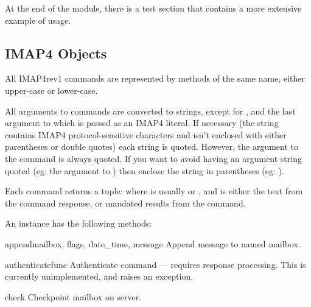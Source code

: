 At the end of the module, there is a test section that contains a more
extensive example of usage.

\begin{seealso}
\end{seealso}


\subsection{IMAP4 Objects \label{imap4-objects}}

All IMAP4rev1 commands are represented by methods of the same name,
either upper-case or lower-case.

All arguments to commands are converted to strings, except for
, and the last argument to  which is
passed as an IMAP4 literal.  If necessary (the string contains IMAP4
protocol-sensitive characters and isn't enclosed with either
parentheses or double quotes) each string is quoted. However, the
 argument to the  command is always quoted.
If you want to avoid having an argument string quoted
(eg: the  argument to ) then enclose the string in
parentheses (eg: ).

Each command returns a tuple:  where  is usually  or ,
and  is either the text from the command response, or
mandated results from the command.

An  instance has the following methods:


\begin{methoddesc}{append}{mailbox, flags, date_time, message}
  Append message to named mailbox. 
\end{methoddesc}

\begin{methoddesc}{authenticate}{func}
  Authenticate command --- requires response processing. This is
  currently unimplemented, and raises an exception. 
\end{methoddesc}

\begin{methoddesc}{check}{}
  Checkpoint mailbox on server. 
\end{methoddesc}

